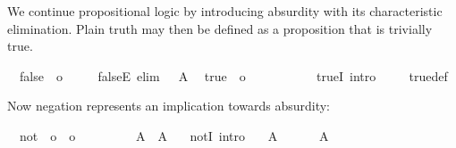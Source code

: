 \begin{isabellebody}
\begin{isamarkuptext}
  \medskip We continue propositional logic by introducing absurdity
  with its characteristic elimination.  Plain truth may then be
  defined as a proposition that is trivially true.%
\end{isamarkuptext}%
\isamarkuptrue%
\isamarkupfalse%
\isanewline
\ \ false\ {\isacharcolon}{\isacharcolon}\ o\ \ {\isacharparenleft}{\isachardoublequoteopen}{\isasymbottom}{\isachardoublequoteclose}{\isacharparenright}\ \isanewline
\ \ falseE\ {\isacharbrackleft}elim{\isacharbrackright}{\isacharcolon}\ {\isachardoublequoteopen}{\isasymbottom}\ {\isasymLongrightarrow}\ A{\isachardoublequoteclose}\isanewline
\isanewline
{}\isamarkupfalse%
\isanewline
\ \ true\ {\isacharcolon}{\isacharcolon}\ o\ \ {\isacharparenleft}{\isachardoublequoteopen}{\isasymtop}{\isachardoublequoteclose}{\isacharparenright}\ \isanewline
\ \ {\isachardoublequoteopen}{\isasymtop}\ {\isasymequiv}\ {\isasymbottom}\ {\isasymlongrightarrow}\ {\isasymbottom}{\isachardoublequoteclose}\isanewline
\isanewline
{}\isamarkupfalse%
\ trueI\ {\isacharbrackleft}intro{\isacharbrackright}{\isacharcolon}\ {\isasymtop}\isanewline
%
\isadelimproof
\ \ %
\endisadelimproof
%
\isatagproof
{}\isamarkupfalse%
\ true{\isacharunderscore}def\ \isacommand{{\isachardot}{\isachardot}}\isamarkupfalse%
%
\endisatagproof
{\isafoldproof}%
%
\isadelimproof
%
\endisadelimproof
%
\begin{isamarkuptext}%
\medskip Now negation represents an implication towards absurdity:%
\end{isamarkuptext}%
\isamarkuptrue%
\isamarkupfalse%
\isanewline
\ \ not\ {\isacharcolon}{\isacharcolon}\ {\isachardoublequoteopen}o\ {\isasymRightarrow}\ o{\isachardoublequoteclose}\ \ {\isacharparenleft}{\isachardoublequoteopen}{\isasymnot}\ {\isacharunderscore}{\isachardoublequoteclose}\ {\isacharbrackleft}{}{}{\isacharbrackright}\ {}{}{\isacharparenright}\ \isanewline
\ \ {\isachardoublequoteopen}{\isasymnot}\ A\ {\isasymequiv}\ A\ {\isasymlongrightarrow}\ {\isasymbottom}{\isachardoublequoteclose}\isanewline
\isanewline
{}\isamarkupfalse%
\ notI\ {\isacharbrackleft}intro{\isacharbrackright}{\isacharcolon}\isanewline
\ \ \ {\isachardoublequoteopen}A\ {\isasymLongrightarrow}\ {\isasymbottom}{\isachardoublequoteclose}\isanewline
\ \ \ {\isachardoublequoteopen}{\isasymnot}\ A{\isachardoublequoteclose}\isanewline

\end{isabellebody}
